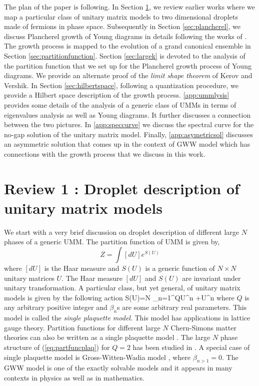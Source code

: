 \documentclass[final,3p,12pt,times]{elsarticle}
\numberwithin{equation}{section}
\begin{document}
The plan of the paper is following. In Section \ref{sec:umm}, we review earlier works where we map a particular class of unitary matrix models to two dimensional droplets made of fermions in phase space. Subsequently in Section \ref{sec:plancherel}, we discuss Plancherel growth of Young diagrams in details following the works of \cite{VerKer77}. The growth process is mapped to the evolution of a grand canonical ensemble in Section \ref{sec:partitionfunction}. Section \ref{sec:largek} is devoted to the analysis of the partition function that we set up for the Plancherel growth process of Young diagrams. We provide an alternate proof of the \emph{limit shape theorem} of Kerov and Vershik. In Section \ref{sec:hilbertspace}, following a quantization procedure, we provide a Hilbert space description of the growth process. \ref{app:ummlysis} provides some details of the analysis of a generic class of UMMs in terms of eigenvalues analysis as well as Young diagrams. It further discusses a connection between the two pictures. In \ref{app:speccurve} we discuss the spectral curve for the no-gap solution of the unitary matrix model. Finally, \ref{app:asymetricsol} discusses an asymmetric solution that comes up in the context of GWW model which has connections with the growth process that we discuss in this work.



\section{Review 1 : Droplet description of unitary matrix models }
\label{sec:umm}

We start with a very brief discussion on droplet description of different large $N$ phases of a generic UMM. The partition function of UMM is given by,
%
\begin{equation}\label{eq:Zumm}
Z=\int [dU] e^{S(U)}
\end{equation}
%
where $[dU]$ is the Haar measure and $S(U)$ is a generic function of $N\times N$ unitary matrices $U$. The Haar measure $[dU]$ and $S(U)$ are invariant under unitary transformation. A particular class, but yet general, of unitary matrix models is given by the following action 
%
\ben\label{eq:partfuncplaq}
S(U)=N \sum_{n=1}^{Q}\lb \Tr U^n +\Tr U^{\dagger n}\rb 
\een
%
where $Q$ is any arbitrary positive integer and $\beta_n$s are some arbitrary real parameters. This model is called the \emph{single plaquette model}. This model has applications in lattice gauge theory. Partition functions for different large $N$ Chern-Simons matter theories can also be written as a single plaquette model \cite{Chattopadhyay:2019lpr}. The large $N$ phase structure of (\ref{eq:partfuncplaq}) for $Q=2$ has been studied in \cite{zalewski,Mandal:1989ry}. A special case of single plaquette model is Gross-Witten-Wadia model \cite{gross-witten,wadia}, where $\beta_{n>1}=0$. {The GWW model is one of the exactly solvable models and it appears in many contexts in physics as well as in mathematics.}
\end{document}
